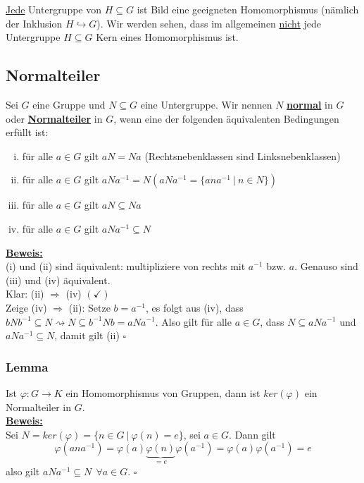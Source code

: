 \documentclass[a4paper, pagesize=pdftex, pdftex, twoside, headsepline, index=totoc,toc=listof, fontsize=10pt, cleardoublepage=empty, headinclude, DIV=13, BCOR=13mm]{scrartcl}
\newcommand{\bet}[1]{\uline{\textbf{#1}}} %
\newcommand{\Index}[1]{\uline{\textbf{#1}}\index{#1}} %
\begin{document}
\uline{Jede} Untergruppe von $H\subseteq G$ ist Bild eine geeigneten Homomorphismus (nämlich der Inklusion $H \hookrightarrow G$). Wir werden sehen, dass im allgemeinen \uline{nicht} jede Untergruppe $H\subseteq G$ Kern eines Homomorphismus ist.

\subsection{Normalteiler}
\label{sub:normalteiler}
Sei $G$ eine Gruppe und $N\subseteq G$ eine Untergruppe. Wir nennen $N$ \Index{normal} in $G$ oder \Index{Normalteiler} in $G$, wenn eine der folgenden äquivalenten Bedingungen erfüllt ist:
\begin{enumerate}[(i)]
	\item für alle $a\in G$ gilt $aN=Na$ (Rechtsnebenklassen sind Linksnebenklassen)
	\item für alle $a\in G$ gilt $aNa^{-1}=N (aNa^{-1}=\{ana^{-1}~|~n\in N \})$
	\item für alle $a\in G$ gilt $aN\subseteq Na$
	\item für alle $a\in G$ gilt $aNa^{-1}\subseteq N$
\end{enumerate}

\bet{Beweis:}\\
(i) und (ii) sind äquivalent: multipliziere von rechts mit $a^{-1}$ bzw. $a$. Genauso sind (iii) und (iv) äquivalent.\\
Klar: (ii) $\Rightarrow$ (iv) $(\checkmark)$\\
Zeige (iv) $\Rightarrow$ (ii): Setze $b=a^{-1}$, es folgt aus (iv), dass $bNb^{-1}\subseteq N \rightsquigarrow N\subseteq b^{-1}Nb=aNa^{-1}$. Also gilt für alle $a\in G$, dass $N\subseteq aNa^{-1}$ und $aNa^{-1}\subseteq N$, damit gilt (ii)
\hfill $\square$

\subsubsection*{Lemma}
Ist $\varphi: G \to K$ ein Homomorphismus von Gruppen, dann ist $ker(\varphi)$ ein Normalteiler in $G$.\\

\bet{Beweis:}\\
Sei $N=ker(\varphi)=\{n\in G~|~\varphi(n)=e\}$, sei $a\in G$. Dann gilt 
\[
\varphi(ana^{-1})=\varphi(a)\underbrace{\varphi(n)}_{=e}\varphi(a^{-1})=\varphi(a)\varphi(a^{-1})=e
\]
also gilt $aNa^{-1}\subseteq N~~\forall a\in G$.
\hfill $\square$
\end{document}
